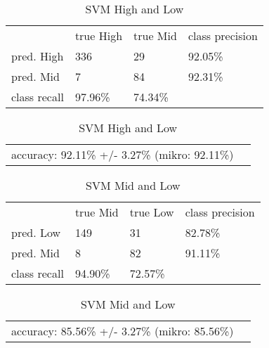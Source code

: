 \begin{table}
\small
\centering
\captionsetup{font=footnotesize}
\caption{SVM High and Low}
\label{tab:SVMhm} 
\small
\begin{tabular}{p{2cm} p{2cm} p{2cm} p{3cm} }
\hline{\smallskip}
 &	true High	&	true Mid	&	class precision\\	
\noalign{\smallskip}\hline\noalign{\smallskip}
\small{	pred. High	}& \small{	336	}& \small{	29	}& \small{	92.05\%	}\\
\small{	pred. Mid	}& \small{	7	}& \small{	84	}& \small{	92.31\%	}\\
\small{	class recall	}& \small{	97.96\%	}& \small{	74.34\%	}& \small{		}\\

\hline
\end{tabular}
\begin{tabular}{p{5cm} p{5cm}  }
\small{	accuracy: 92.11\% +/- 3.27\% (mikro: 92.11\%)}\\

\end{tabular}
\end{table}
\begin{table}
\small
\centering
\captionsetup{font=footnotesize}
\caption{SVM Mid and Low}
\label{tab:SVMhm} 
\small
\begin{tabular}{p{2cm} p{2cm} p{2cm} p{3cm} }
\hline{\smallskip}
 &	true Mid	&	true Low	&	class precision\\	
\noalign{\smallskip}\hline\noalign{\smallskip}
\small{	pred. Low	}& \small{	149	}& \small{	31	}& \small{	82.78\%	}\\
\small{	pred. Mid	}& \small{	8	}& \small{	82	}& \small{	91.11\%	}\\
\small{	class recall	}& \small{	94.90\%	}& \small{	72.57\%	}& \small{		}\\
\hline
\end{tabular}
\begin{tabular}{p{5cm} p{5cm}  }
\small{	accuracy: 85.56\% +/- 3.27\% (mikro: 85.56\%)}\\

\end{tabular}
\end{table}

